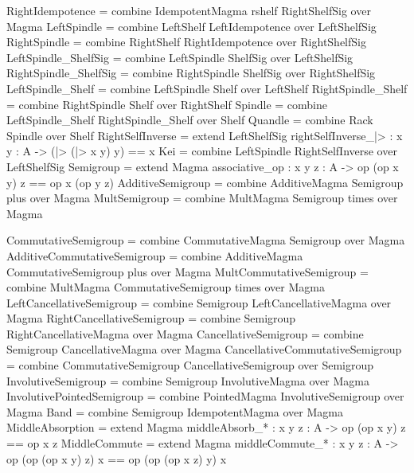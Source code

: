 \begin{togcode} 
RightIdempotence = 
  combine IdempotentMagma rshelf RightShelfSig {} over Magma
  LeftSpindle = 
  combine LeftShelf {} LeftIdempotence {} over LeftShelfSig
RightSpindle = 
  combine RightShelf {} RightIdempotence {} over RightShelfSig
LeftSpindle_ShelfSig  = 
  combine LeftSpindle {} ShelfSig {} over LeftShelfSig
RightSpindle_ShelfSig = 
  combine RightSpindle {} ShelfSig {} over RightShelfSig 
LeftSpindle_Shelf = 
  combine LeftSpindle {} Shelf {} over LeftShelf 
RightSpindle_Shelf = 
  combine RightSpindle {} Shelf {} over RightShelf
Spindle = 
  combine LeftSpindle_Shelf {} RightSpindle_Shelf {} over Shelf 
Quandle = 
  combine Rack {} Spindle {} over Shelf 
RightSelfInverse = extend LeftShelfSig 
     {rightSelfInverse_|> : {x y : A} -> (|> (|> x y) y) == x}
Kei = combine LeftSpindle {} RightSelfInverse {} over LeftShelfSig
Semigroup = extend Magma 
     {associative_op : {x y z : A} -> op (op x y) z == op x (op y z)}
AdditiveSemigroup = combine AdditiveMagma {} Semigroup plus over Magma
MultSemigroup = combine MultMagma {} Semigroup times over Magma 
\end{togcode} 

\begin{togcode} 
CommutativeSemigroup = 
  combine CommutativeMagma {} Semigroup {} over Magma 
AdditiveCommutativeSemigroup = 
  combine AdditiveMagma {} CommutativeSemigroup plus over Magma
MultCommutativeSemigroup = 
  combine MultMagma {} CommutativeSemigroup times over Magma  
  LeftCancellativeSemigroup = 
  combine Semigroup {} LeftCancellativeMagma {} over Magma
RightCancellativeSemigroup = 
  combine Semigroup {} RightCancellativeMagma {} over Magma  
CancellativeSemigroup = 
  combine Semigroup {} CancellativeMagma {} over Magma 
CancellativeCommutativeSemigroup = 
  combine CommutativeSemigroup {} CancellativeSemigroup {} 
  over Semigroup
InvolutiveSemigroup = 
  combine Semigroup {} InvolutiveMagma {} over Magma
InvolutivePointedSemigroup = 
  combine PointedMagma{} InvolutiveSemigroup {} over Magma
Band = combine Semigroup {} IdempotentMagma {} over Magma
MiddleAbsorption = 
  extend Magma {middleAbsorb_* : {x y z : A} -> op (op x y) z == op x z}
MiddleCommute = 
  extend Magma {middleCommute_* : {x y z : A} -> 
       op (op (op x y) z) x == op (op (op x z) y) x}
\end{togcode} 

